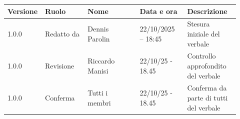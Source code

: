 \documentclass[a4paper,12pt]{article}
\begin{document}
\begin{center}
\small
\renewcommand{\arraystretch}{1.2} 
\begin{tabular}{|p{0.1\linewidth}|p{0.18\linewidth}|p{0.22\linewidth}|p{0.20\linewidth}|p{0.22\linewidth}|}
\hline
\rowcolor{gray!60} 
\textbf{Versione} & \textbf{Ruolo} & \textbf{Nome} & \textbf{Data e ora} & \textbf{Descrizione} \\
\hline
\rowcolor{white}
1.0.0 & Redatto da & Dennis Parolin & 22/10/2025 – 18:45 & Stesura iniziale del verbale \\
\hline
\rowcolor{gray!20}
1.0.0 & Revisione & Riccardo Manisi & 22/10/25 - 18.45 & Controllo approfondito del verbale \\
\hline
\rowcolor{white}
1.0.0 & Conferma & Tutti i membri & 22/10/25 - 18.45 & Conferma da parte di tutti del verbale \\
\hline
\end{tabular}
\end{center}
\end{document}
